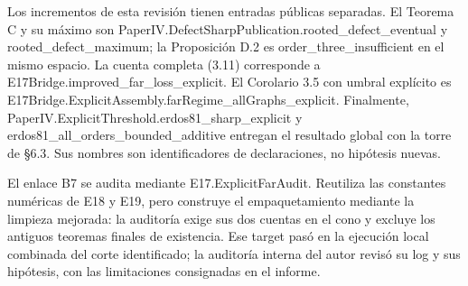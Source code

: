 \documentclass[spanish,11pt,a4paper]{article}
\begin{document}
Los incrementos de esta revisión tienen entradas públicas separadas. El Teorema C y su máximo son {\ttfamily\small PaperIV.\discretionary{\hbox{\ensuremath{\hookrightarrow}}}{}{}DefectSharpP\discretionary{\hbox{\ensuremath{\hookrightarrow}}}{}{}ublication.\discretionary{\hbox{\ensuremath{\hookrightarrow}}}{}{}rooted\_\discretionary{\hbox{\ensuremath{\hookrightarrow}}}{}{}defect\_\discretionary{\hbox{\ensuremath{\hookrightarrow}}}{}{}eventual} y {\ttfamily\small rooted\_\discretionary{\hbox{\ensuremath{\hookrightarrow}}}{}{}defect\_\discretionary{\hbox{\ensuremath{\hookrightarrow}}}{}{}maximum}; la Proposición D.2 es {\ttfamily\small order\_\discretionary{\hbox{\ensuremath{\hookrightarrow}}}{}{}three\_\discretionary{\hbox{\ensuremath{\hookrightarrow}}}{}{}insufficient} en el mismo espacio. La cuenta completa (3.11) corresponde a {\ttfamily\small E17Bridge.\discretionary{\hbox{\ensuremath{\hookrightarrow}}}{}{}improved\_\discretionary{\hbox{\ensuremath{\hookrightarrow}}}{}{}far\_\discretionary{\hbox{\ensuremath{\hookrightarrow}}}{}{}loss\_\discretionary{\hbox{\ensuremath{\hookrightarrow}}}{}{}explicit}. El Corolario 3.5 con umbral explícito es {\ttfamily\small E17Bridge.\discretionary{\hbox{\ensuremath{\hookrightarrow}}}{}{}ExplicitAsse\discretionary{\hbox{\ensuremath{\hookrightarrow}}}{}{}mbly.\discretionary{\hbox{\ensuremath{\hookrightarrow}}}{}{}farRegime\_\discretionary{\hbox{\ensuremath{\hookrightarrow}}}{}{}allGraphs\_\discretionary{\hbox{\ensuremath{\hookrightarrow}}}{}{}explicit}. Finalmente, {\ttfamily\small PaperIV.\discretionary{\hbox{\ensuremath{\hookrightarrow}}}{}{}ExplicitThre\discretionary{\hbox{\ensuremath{\hookrightarrow}}}{}{}shold.\discretionary{\hbox{\ensuremath{\hookrightarrow}}}{}{}erdos81\_\discretionary{\hbox{\ensuremath{\hookrightarrow}}}{}{}sharp\_\discretionary{\hbox{\ensuremath{\hookrightarrow}}}{}{}explicit} y {\ttfamily\small erdos81\_\discretionary{\hbox{\ensuremath{\hookrightarrow}}}{}{}all\_\discretionary{\hbox{\ensuremath{\hookrightarrow}}}{}{}orders\_\discretionary{\hbox{\ensuremath{\hookrightarrow}}}{}{}bounded\_\discretionary{\hbox{\ensuremath{\hookrightarrow}}}{}{}additive} entregan el resultado global con la torre de §6.3. Sus nombres son identificadores de declaraciones, no hipótesis nuevas.

El enlace B7 se audita mediante {\ttfamily\small E17.\discretionary{\hbox{\ensuremath{\hookrightarrow}}}{}{}ExplicitFarA\discretionary{\hbox{\ensuremath{\hookrightarrow}}}{}{}udit}. Reutiliza las constantes numéricas de {\ttfamily\small E18} y {\ttfamily\small E19}, pero construye el empaquetamiento mediante la limpieza mejorada: la auditoría exige sus dos cuentas en el cono y excluye los antiguos teoremas finales de existencia. Ese target pasó en la ejecución local combinada del corte identificado; la auditoría interna del autor revisó su log y sus hipótesis, con las limitaciones consignadas en el informe.
\end{document}
